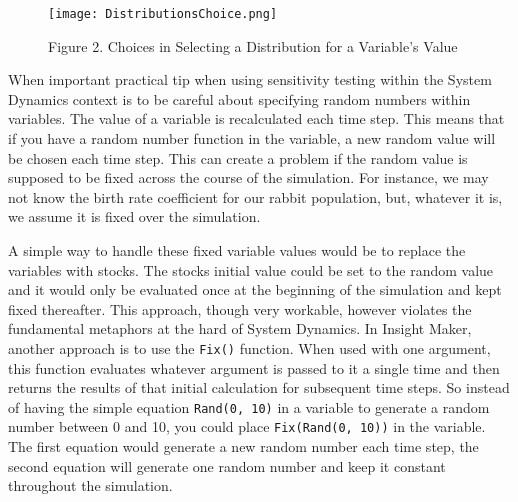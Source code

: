 \documentclass[]{memoir}
\let\Oldincludegraphics\includegraphics
\renewcommand{\includegraphics}[1]{\Oldincludegraphics[max size={\textwidth}{\textheight}]{#1}}
\begin{document}
\begin{figure}[htbp]
\centering
\texttt{[image: DistributionsChoice.png]}
\caption{Figure 2. Choices in Selecting a Distribution for a Variable's
Value}
\end{figure}

When important practical tip when using sensitivity testing within the
System Dynamics context is to be careful about specifying random numbers
within variables. The value of a variable is recalculated each time
step. This means that if you have a random number function in the
variable, a new random value will be chosen each time step. This can
create a problem if the random value is supposed to be fixed across the
course of the simulation. For instance, we may not know the birth rate
coefficient for our rabbit population, but, whatever it is, we assume it
is fixed over the simulation.

A simple way to handle these fixed variable values would be to replace
the variables with stocks. The stocks initial value could be set to the
random value and it would only be evaluated once at the beginning of the
simulation and kept fixed thereafter. This approach, though very
workable, however violates the fundamental metaphors at the hard of
System Dynamics. In Insight Maker, another approach is to use the
\lstinline!Fix()! function. When used with one argument, this function
evaluates whatever argument is passed to it a single time and then
returns the results of that initial calculation for subsequent time
steps. So instead of having the simple equation \lstinline!Rand(0, 10)!
in a variable to generate a random number between 0 and 10, you could
place \lstinline!Fix(Rand(0, 10))! in the variable. The first equation
would generate a new random number each time step, the second equation
will generate one random number and keep it constant throughout the
simulation.

\FloatBarrier 
\end{document}
